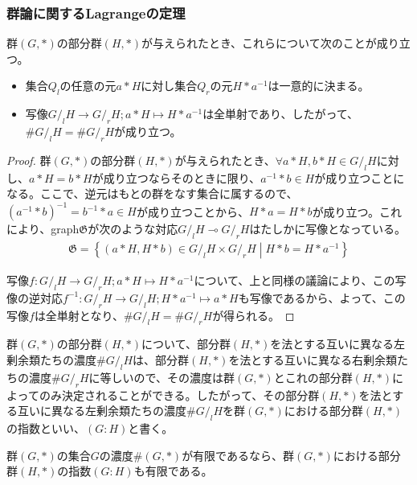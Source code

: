 \documentclass[dvipdfmx]{jsarticle}
\begin{document}
\subsubsection{群論に関するLagrangeの定理}%
\begin{thm}\label{3.1.1.31}
群$(G,*)$の部分群$(H,*)$が与えられたとき、これらについて次のことが成り立つ。
\begin{itemize}
\item
  集合$Q_{l}$の任意の元$a*H$に対し集合$Q_{r}$の元$H*a^{- 1}$は一意的に決まる。
\item
  写像${G}/_l {H} \rightarrow {G}/_r {H};a*H \mapsto H*a^{- 1}$は全単射であり、したがって、$\#{G}/_l {H} = \#{G}/_r {H}$が成り立つ。
\end{itemize}
\end{thm}
\begin{proof}
群$(G,*)$の部分群$(H,*)$が与えられたとき、$\forall a*H,b*H \in {G}/_l {H}$に対し、$a*H = b*H$が成り立つならそのときに限り、$a^{- 1}*b \in H$が成り立つことになる。ここで、逆元はもとの群をなす集合に属するので、$\left( a^{- 1}*b \right)^{- 1} = b^{- 1}*a \in H$が成り立つことから、$H*a = H*b$が成り立つ。これにより、graph$\mathfrak{G}$が次のような対応${G}/_l {H}\multimap {G}/_r {H}$はたしかに写像となっている。
\begin{align*}
\mathfrak{G}=\left\{ (a*H,H*b) \in {G}/_l {H} \times {G}/_r {H} \middle| H*b = H*a^{- 1} \right\}
\end{align*}\par
写像$f:{G}/_l {H} \rightarrow {G}/_r {H};a*H \mapsto H*a^{- 1}$について、上と同様の議論により、この写像の逆対応$f^{- 1}:{G}/_r {H} \rightarrow {G}/_l {H};H*a^{- 1} \mapsto a*H$も写像であるから、よって、この写像$f$は全単射となり、$\#{G}/_l {H} = \#{G}/_r {H}$が得られる。
\end{proof}
\begin{dfn}
群$(G,*)$の部分群$(H,*)$について、部分群$(H,*)$を法とする互いに異なる左剰余類たちの濃度$\#{G}/_l {H}$は、部分群$(H,*)$を法とする互いに異なる右剰余類たちの濃度$\#{G}/_r {H}$に等しいので、その濃度は群$(G,*)$とこれの部分群$(H,*)$によってのみ決定されることができる。したがって、その部分群$(H,*)$を法とする互いに異なる左剰余類たちの濃度$\#{G}/_l {H}$を群$(G,*)$における部分群$(H,*)$の指数といい、$(G:H)$と書く。
\end{dfn}
\begin{thm}\label{3.1.1.32}
群$(G,*)$の集合$G$の濃度$\#(G,*)$が有限であるなら、群$(G,*)$における部分群$(H,*)$の指数$(G:H)$も有限である。
\end{thm}
\end{document}
